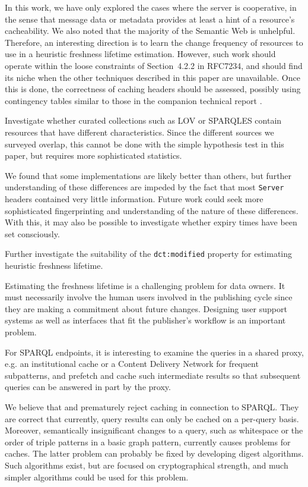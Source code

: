\documentclass{llncs}
\newcommand{\rdfterm}[1]{\texttt{#1}}
\newcommand{\httph}[1]{\texttt{#1}}
\begin{document}
In this work, we have only explored the cases where the server is
cooperative, in the sense that message data or metadata provides at
least a hint of a resource's cacheability. We also noted that the
majority of the Semantic Web is unhelpful. Therefore, an interesting
direction is to learn the change frequency of resources to use in a
heuristic freshness lifetime estimation. However, such work should
operate within the loose constraints of Section~4.2.2 in RFC7234, and
should find its niche when the other techniques described in this paper
are unavailable. Once this is done, the correctness of caching headers
should be assessed, possibly using contingency tables similar to those
in the companion technical report \cite{kjernsmo_add_survey_2015}.

Investigate whether curated collections such as LOV or SPARQLES
contain resources that have different characteristics. Since the
different sources we surveyed overlap, this cannot be done with the
simple hypothesis test in this paper, but requires more sophisticated
statistics.

We found that some implementations are likely better than others, but
further understanding of these differences are impeded by the fact
that most \httph{Server} headers contained very little
information. Future work could seek more sophisticated fingerprinting
and understanding of the nature of these differences. With this, it
may also be possible to investigate whether expiry times have been set
consciously.

Further investigate the suitability of the \rdfterm{dct:modified}
property for estimating heuristic freshness lifetime.

Estimating the freshness lifetime is a challenging problem for data
owners. It must necessarily involve the human users involved in the
publishing cycle since they are making a commitment about future
changes. Designing user support systems as well as interfaces that fit
the publisher's workflow is an important problem.

For SPARQL endpoints, it is interesting to examine the queries in a
shared proxy, e.g. an institutional cache or a Content
Delivery Network for frequent subpatterns, and prefetch and cache such
intermediate results so that subsequent queries can be answered in
part by the proxy.

We believe that  \cite{ldf1} and \cite{hogan2014paths} prematurely
reject caching in connection to SPARQL. They are correct that
currently, query results can only be cached on a per-query
basis. Moreover, semantically insignificant changes to a query, such
as whitespace or the order of triple patterns in a basic graph
pattern, currently causes problems for caches. The latter problem can
probably be fixed by developing digest algorithms. Such algorithms
exist, but are focused on cryptographical strength, and much simpler
algorithms could be used for this problem.
\end{document}
